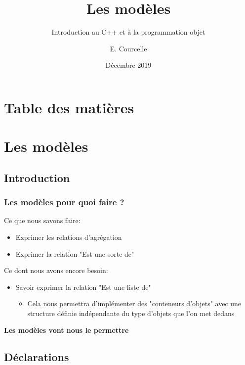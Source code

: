 \documentclass{beamer}
\title{Les modèles}
\subtitle{Introduction au C++ et à la programmation objet}
\author{E. Courcelle}\institute{CALMIP, UMS 3669}
\date{Décembre 2019}
\begin{document}
\begin{frame}
\titlepage
\end{frame}

\section*{Table des matières}
\begin{frame}
\tableofcontents
\end{frame}


\section{Les modèles}

\subsection{Introduction}

\begin{frame}[fragile=singleslide,shrink=20]
\frametitle {Les modèles pour quoi faire ?}

Ce que nous savons faire:
\begin{itemize}
\item{Exprimer les relations d'agrégation}
\item{Exprimer la relation "Est une sorte de"}
\end{itemize}

Ce dont nous avons encore besoin:
\begin{itemize}
\item{Savoir exprimer la relation "Est une liste de"}
\begin{itemize}
\item{Cela nous permettra d'implémenter des "conteneurs d'objets" avec une structure définie indépendante du type d'objets que l'on met dedans}
\end{itemize}
\end{itemize}

\textbf{Les modèles vont nous le permettre}
\end{frame}

\subsection{Déclarations}
\end{document}
